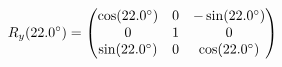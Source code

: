 \documentclass[preview]{standalone}
\begin{document}
\begin{align*}
\special{dvisvgm:raw <g id='unique000'>}R_y(22.0^\circ) = \begin{pmatrix} \cos(22.0^\circ) & 0 & -\sin(22.0^\circ) \\ 0 & 1 & 0 \\ \sin(22.0^\circ) & 0 & \cos(22.0^\circ) \end{pmatrix}\special{dvisvgm:raw </g>}
\end{align*}
\end{document}
